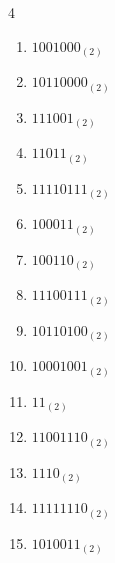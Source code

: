 \begin{multicols}{4}
\begin{enumerate}
        \phantom{$=122$}

  \item $1001000_{(2)}$

        \phantom{$=72$}

\columnbreak %

  \item $10110000_{(2)}$

        \phantom{$=176$}

  \item $111001_{(2)}$

        \phantom{$=57$}

  \item $11011_{(2)}$

        \phantom{$=27$}

  \item $11110111_{(2)}$

        \phantom{$=247$}

  \item $100011_{(2)}$

        \phantom{$=35$}

  \item $100110_{(2)}$

        \phantom{$=38$}

  \item $11100111_{(2)}$

        \phantom{$=231$}

  \item $10110100_{(2)}$

        \phantom{$=180$}

  \item $10001001_{(2)}$

        \phantom{$=137$}

  \item $11_{(2)}$

        \phantom{$=3$}

  \item $11001110_{(2)}$

        \phantom{$=206$}

  \item $1110_{(2)}$

        \phantom{$=14$}

  \item $11111110_{(2)}$

        \phantom{$=254$}

  \item $1010011_{(2)}$


\end{enumerate}
\end{multicols}
